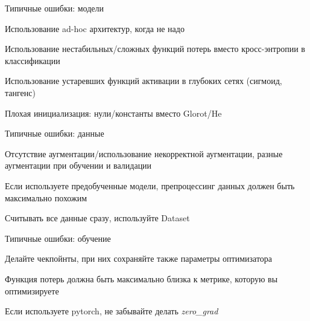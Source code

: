 \documentclass[notes,12pt, aspectratio=169]{beamer}
\newenvironment{wideitemize}{\itemize\addtolength{\itemsep}{10pt}}{\enditemize}
\begin{document}
\begin{frame}{Типичные ошибки: модели}
\begin{wideitemize}
	\item Использование ad-hoc архитектур, когда не надо
	\item Использование нестабильных/сложных функций потерь вместо кросс-энтропии в классификации 
	\item Использование устаревших функций активации в глубоких сетях (сигмоид, тангенс)
	\item Плохая инициализация: нули/константы вместо Glorot/He
\end{wideitemize}
\end{frame}


\begin{frame}{Типичные ошибки: данные}
\begin{wideitemize}
	\item Отсутствие аугментации/использование некорректной аугментации, разные аугментации при обучении и валидации 
	\item Если используете предобученные модели, препроцессинг данных должен быть максимально похожим 
	\item Считывать все данные сразу, используйте Dataset 
\end{wideitemize}
\end{frame}


\begin{frame}{Типичные ошибки: обучение}
	\begin{wideitemize}
		\item Делайте чекпойнты, при них сохраняйте также параметры оптимизатора
		\item Функция потерь должна быть максимально близка к метрике, которую вы оптимизируете 
		\item Если используете pytorch, не забывайте делать \textit{zero\_grad} 
	\end{wideitemize}
\end{frame}
\end{document}
